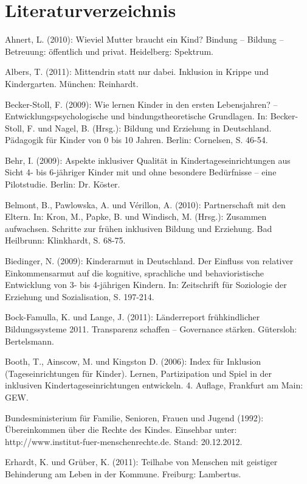 \chapter*{Literaturverzeichnis}

Ahnert, L. (2010): Wieviel Mutter braucht ein Kind? Bindung – Bildung – Betreuung: öffentlich und privat. Heidelberg: Spektrum.

Albers, T. (2011): Mittendrin statt nur dabei. Inklusion in Krippe und Kindergarten. München: Reinhardt.

Becker-Stoll, F. (2009): Wie lernen Kinder in den ersten Lebensjahren? – Entwicklungspsychologische und bindungstheoretische Grundlagen. In: Becker-Stoll, F. und Nagel, B. (Hrsg.): Bildung und Erziehung in Deutschland. Pädagogik für Kinder von 0 bis 10 Jahren. Berlin: Cornelsen, S. 46-54.

Behr, I. (2009): Aspekte inklusiver Qualität in Kindertageseinrichtungen aus Sicht 4- bis 6-jähriger Kinder mit und ohne besondere Bedürfnisse – eine Pilotstudie. Berlin: Dr. Köster.

Belmont, B., Pawlowska, A. und Vérillon, A. (2010):
Partnerschaft mit den Eltern. In: Kron, M., Papke, B. und Windisch, M. (Hrsg.): Zusammen aufwachsen. Schritte zur frühen inklusiven Bildung und Erziehung. Bad Heilbrunn: Klinkhardt, S. 68-75.

Biedinger, N. (2009): Kinderarmut in Deutschland. Der Einfluss von relativer Einkommensarmut auf die kognitive, sprachliche und behavioristische Entwicklung von 3- bis 4-jährigen Kindern. In:  Zeitschrift für Soziologie der Erziehung und Sozialisation, S. 197-214. 

Bock-Famulla, K. und Lange, J. (2011): Länderreport frühkindlicher Bildungssysteme 2011. Transparenz schaffen – Governance stärken.
Gütersloh: Bertelsmann.

Booth, T., Ainscow, M. und Kingston D. (2006): Index für Inklusion (Tageseinrichtungen für Kinder). Lernen, Partizipation und Spiel in der inklusiven Kindertageseinrichtungen entwickeln. 4. Auflage, Frankfurt am Main: GEW. 

Bundesministerium für Familie, Senioren, Frauen und Jugend (1992): Übereinkommen über die Rechte des Kindes. Einsehbar unter: http://www.institut-fuer-menschenrechte.de. Stand: 20.12.2012.

Erhardt, K. und Grüber, K. (2011): Teilhabe von Menschen mit geistiger Behinderung am Leben in der Kommune. Freiburg: Lambertus.

